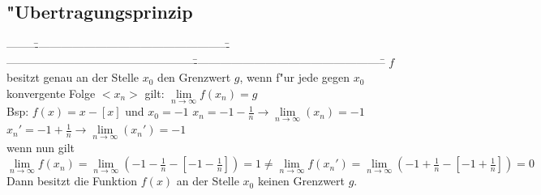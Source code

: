 	\subsection{"Ubertragungsprinzip}
				\begin{tabbing}
		--------\=---------------------------------------------------\=---------------------------------------------------\=---------------------------------------------------\=\kill
			$f$ besitzt genau an der Stelle $x_0$ den Grenzwert $g$, wenn f"ur jede gegen $x_0$ konvergente Folge $<x_n>$ gilt: $\lim\limits_{n\to\infty}f(x_n)=g$\\
			Bsp: \>
			$f(x)=x-[x]$ und $x_0=-1$\>
			$x_n=-1-\frac{1}{n} \rightarrow \lim\limits_{n\to\infty}(x_n)=-1$\>
			$x_n'=-1+\frac{1}{n} \rightarrow \lim\limits_{n\to\infty}(x_n')=-1$\\	
			\>wenn nun gilt\\
			\>$\lim\limits_{n\to\infty}f(x_n)=\lim\limits_{n\to\infty}(-1-\frac{1}{n}-[-1-\frac{1}{n}])=1\neq\lim\limits_{n\to\infty}f(x_n')=\lim\limits_{n\to\infty}(-1+\frac{1}{n}-[-1+\frac{1}{n}])=0$\\
			\>Dann besitzt die Funktion $f(x)$ an der Stelle $x_0$ keinen Grenzwert $g$.
		\end{tabbing}

